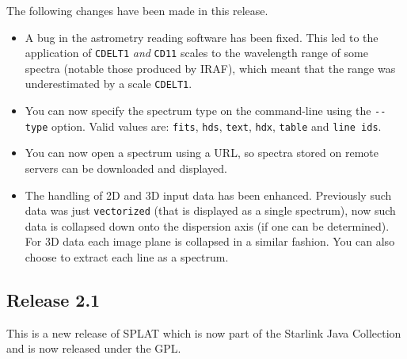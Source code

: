 \documentclass[twoside,11pt]{article}
\renewcommand{\_}{\texttt{\symbol{95}}}
\newcommand{\hitext}[1]{\texttt{#1}}
\begin{document}
 The following changes have been made in this release.
 \begin{itemize}
    \item A bug in the astrometry reading software has been fixed. This led to
      the application of \hitext{CDELT1} \textit{and} \hitext{CD1\_1} scales to the
      wavelength range of some spectra (notable those produced by IRAF), which
      meant that the range was underestimated by a scale \hitext{CDELT1}.

    \item You can now specify the spectrum type on the command-line using the
      \verb|--type| option. Valid values are: \hitext{fits}, \hitext{hds},
      \hitext{text}, \hitext{hdx}, \hitext{table} and \hitext{line ids}.

    \item You can now open a spectrum using a URL, so spectra stored on remote
      servers can be downloaded and displayed.

    \item The handling of 2D and 3D input data has been enhanced. Previously
      such data was just \hitext{vectorized} (that is displayed as a single
      spectrum), now such data is collapsed down onto the dispersion axis (if
      one can be determined). For 3D data each image plane is collapsed in a
      similar fashion. You can also choose to extract each line as a spectrum.
\end{itemize}

\subsection{Release 2.1}

This is a new release of SPLAT which is now part of the Starlink
Java Collection and is now released under the GPL.
\end{document}
